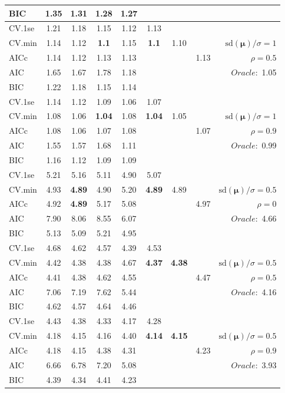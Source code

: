 \begin{table}
\begin{center}
\begin{tabular}{l*{7}{c}|r}
BIC & 1.35 & 1.31 & 1.28 & 1.27 & & & &  \\
 \hline 
CV.1se & 1.21 & 1.18 & 1.15 & 1.12 & 1.13 & & & \\
CV.min & 1.14 & 1.12 & {\bf 1.1} & 1.15 & {\bf 1.1} & 1.10 & & $\mathrm{sd}(\mathbf{\mu})/\sigma=1$ \\
AICc & 1.14 & 1.12 & 1.13 & 1.13 & & & 1.13 &  $\rho=0.5$ \\
AIC & 1.65 & 1.67 & 1.78 & 1.18 & & & &  \multirow{2}{*}{$Oracle: $ 1.05} \\
BIC & 1.22 & 1.18 & 1.15 & 1.14 & & & &  \\
 \hline 
CV.1se & 1.14 & 1.12 & 1.09 & 1.06 & 1.07 & & & \\
CV.min & 1.08 & 1.06 & {\bf 1.04} & 1.08 & {\bf 1.04} & 1.05 & & $\mathrm{sd}(\mathbf{\mu})/\sigma=1$ \\
AICc & 1.08 & 1.06 & 1.07 & 1.08 & & & 1.07 &  $\rho=0.9$ \\
AIC & 1.55 & 1.57 & 1.68 & 1.11 & & & &  \multirow{2}{*}{$Oracle: $ 0.99} \\
BIC & 1.16 & 1.12 & 1.09 & 1.09 & & & &  \\
 \hline 
CV.1se & 5.21 & 5.16 & 5.11 & 4.90 & 5.07 & & & \\
CV.min & 4.93 & {\bf 4.89} & 4.90 & 5.20 & {\bf 4.89} & 4.89 & & $\mathrm{sd}(\mathbf{\mu})/\sigma=0.5$ \\
AICc & 4.92 & {\bf 4.89} & 5.17 & 5.08 & & & 4.97 &  $\rho=0$ \\
AIC & 7.90 & 8.06 & 8.55 & 6.07 & & & &  \multirow{2}{*}{$Oracle: $ 4.66} \\
BIC & 5.13 & 5.09 & 5.21 & 4.95 & & & &  \\
 \hline 
CV.1se & 4.68 & 4.62 & 4.57 & 4.39 & 4.53 & & & \\
CV.min & 4.42 & 4.38 & 4.38 & 4.67 & {\bf 4.37} & {\bf 4.38} & & $\mathrm{sd}(\mathbf{\mu})/\sigma=0.5$ \\
AICc & 4.41 & 4.38 & 4.62 & 4.55 & & & 4.47 &  $\rho=0.5$ \\
AIC & 7.06 & 7.19 & 7.62 & 5.44 & & & &  \multirow{2}{*}{$Oracle: $ 4.16} \\
BIC & 4.62 & 4.57 & 4.64 & 4.46 & & & &  \\
 \hline 
CV.1se & 4.43 & 4.38 & 4.33 & 4.17 & 4.28 & & & \\
CV.min & 4.18 & 4.15 & 4.16 & 4.40 & {\bf 4.14} & {\bf 4.15} & & $\mathrm{sd}(\mathbf{\mu})/\sigma=0.5$ \\
AICc & 4.18 & 4.15 & 4.38 & 4.31 & & & 4.23 &  $\rho=0.9$ \\
AIC & 6.66 & 6.78 & 7.20 & 5.08 & & & &  \multirow{2}{*}{$Oracle: $ 3.93} \\
BIC & 4.39 & 4.34 & 4.41 & 4.23 & & & &  \\
 \hline 
\end{tabular}
\end{center}
\vspace{-1cm}
\end{table}




